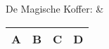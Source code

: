 De Magische Koffer: &
\begin{tabular}{|c|c|c|c|}
	\hline
	\textbf{A} & \textbf{B} & \textbf{C} & \textbf{D} \\
	\hline
\end{tabular} \\